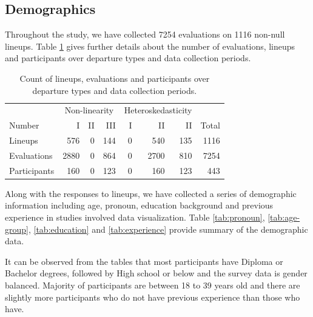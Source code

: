 \documentclass[]{interact}
\theoremstyle{plain}%
\theoremstyle{definition}
\theoremstyle{remark}
\begin{document}
\hypertarget{demographics}{%
\subsection{Demographics}\label{demographics}}

Throughout the study, we have collected 7254 evaluations on 1116
non-null lineups. Table \ref{tab:count-lineup} gives further details
about the number of evaluations, lineups and participants over departure
types and data collection periods.

\begin{table}

\caption{\label{tab:count-lineup}Count of lineups, evaluations and participants over departure types and data collection periods.}
\centering
\begin{tabular}[t]{lrrrrrrr}
\toprule
\multicolumn{1}{c}{ } & \multicolumn{3}{c}{Non-linearity} & \multicolumn{3}{c}{Heteroskedasticity} \\
\cmidrule(l{3pt}r{3pt}){2-4} \cmidrule(l{3pt}r{3pt}){5-7}
Number & I & II & III & I & II & II & Total\\
\midrule
Lineups & 576 & 0 & 144 & 0 & 540 & 135 & 1116\\
Evaluations & 2880 & 0 & 864 & 0 & 2700 & 810 & 7254\\
Participants & 160 & 0 & 123 & 0 & 160 & 123 & 443\\
\bottomrule
\end{tabular}
\end{table}

Along with the responses to lineups, we have collected a series of
demographic information including age, pronoun, education background and
previous experience in studies involved data visualization. Table
\ref{tab:pronoun}, \ref{tab:age-group}, \ref{tab:education} and
\ref{tab:experience} provide summary of the demographic data.

It can be observed from the tables that most participants have Diploma
or Bachelor degrees, followed by High school or below and the survey
data is gender balanced. Majority of participants are between 18 to 39
years old and there are slightly more participants who do not have
previous experience than those who have.

\begin{table}

\caption{\label{tab:pronoun}Summary of pronoun distribution of subjects recuritted in this study.}
\centering
{}
\end{table}
\end{document}
